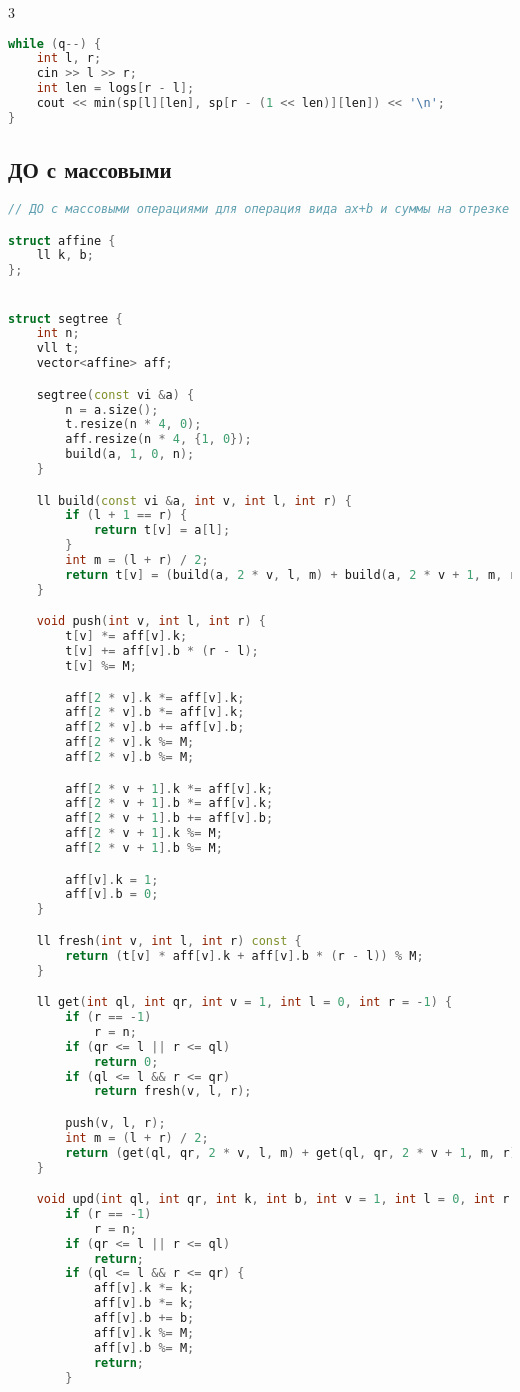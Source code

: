 \documentclass[10pt,a4paper,landscape,twosided]{extarticle}
\begin{document}
\begin{multicols}{3}
\begin{lstlisting}[language=C++]
while (q--) {
    int l, r;
    cin >> l >> r;
    int len = logs[r - l];
    cout << min(sp[l][len], sp[r - (1 << len)][len]) << '\n';
}
\end{lstlisting}

\subsection{ДО с массовыми}
\begin{lstlisting}[language=C++]
// ДО с массовыми операциями для операция вида ax+b и суммы на отрезке по модулю

struct affine {
    ll k, b;
};


struct segtree {
    int n;
    vll t;
    vector<affine> aff;

    segtree(const vi &a) {
        n = a.size();
        t.resize(n * 4, 0);
        aff.resize(n * 4, {1, 0});
        build(a, 1, 0, n);
    }

    ll build(const vi &a, int v, int l, int r) {
        if (l + 1 == r) {
            return t[v] = a[l];
        }
        int m = (l + r) / 2;
        return t[v] = (build(a, 2 * v, l, m) + build(a, 2 * v + 1, m, r)) % M;
    }

    void push(int v, int l, int r) {
        t[v] *= aff[v].k;
        t[v] += aff[v].b * (r - l);
        t[v] %= M;

        aff[2 * v].k *= aff[v].k;
        aff[2 * v].b *= aff[v].k;
        aff[2 * v].b += aff[v].b;
        aff[2 * v].k %= M;
        aff[2 * v].b %= M;

        aff[2 * v + 1].k *= aff[v].k;
        aff[2 * v + 1].b *= aff[v].k;
        aff[2 * v + 1].b += aff[v].b;
        aff[2 * v + 1].k %= M;
        aff[2 * v + 1].b %= M;

        aff[v].k = 1;
        aff[v].b = 0;
    }

    ll fresh(int v, int l, int r) const {
        return (t[v] * aff[v].k + aff[v].b * (r - l)) % M;
    }

    ll get(int ql, int qr, int v = 1, int l = 0, int r = -1) {
        if (r == -1)
            r = n;
        if (qr <= l || r <= ql)
            return 0;
        if (ql <= l && r <= qr)
            return fresh(v, l, r);

        push(v, l, r);
        int m = (l + r) / 2;
        return (get(ql, qr, 2 * v, l, m) + get(ql, qr, 2 * v + 1, m, r)) % M;
    }

    void upd(int ql, int qr, int k, int b, int v = 1, int l = 0, int r = -1) {
        if (r == -1)
            r = n;
        if (qr <= l || r <= ql)
            return;
        if (ql <= l && r <= qr) {
            aff[v].k *= k;
            aff[v].b *= k;
            aff[v].b += b;
            aff[v].k %= M;
            aff[v].b %= M;
            return;
        }


\end{lstlisting}
\end{multicols}
\end{document}
